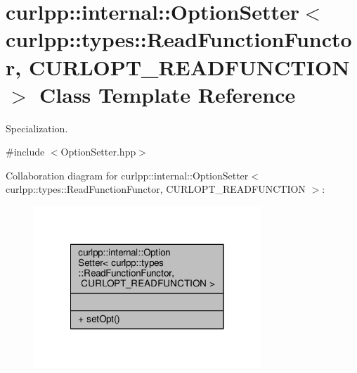 \hypertarget{classcurlpp_1_1internal_1_1OptionSetter_3_01curlpp_1_1types_1_1ReadFunctionFunctor_00_01CURLOPT__READFUNCTION_01_4}{\section{curlpp\-:\-:internal\-:\-:Option\-Setter$<$ curlpp\-:\-:types\-:\-:Read\-Function\-Functor, C\-U\-R\-L\-O\-P\-T\-\_\-\-R\-E\-A\-D\-F\-U\-N\-C\-T\-I\-O\-N $>$ Class Template Reference}
\label{classcurlpp_1_1internal_1_1OptionSetter_3_01curlpp_1_1types_1_1ReadFunctionFunctor_00_01CURLOPT__READFUNCTION_01_4}
}


Specialization.  




{\ttfamily \#include $<$Option\-Setter.\-hpp$>$}



Collaboration diagram for curlpp\-:\-:internal\-:\-:Option\-Setter$<$ curlpp\-:\-:types\-:\-:Read\-Function\-Functor, C\-U\-R\-L\-O\-P\-T\-\_\-\-R\-E\-A\-D\-F\-U\-N\-C\-T\-I\-O\-N $>$\-:\nopagebreak
\begin{figure}[H]
\begin{center}
\leavevmode
\includegraphics[width=242pt]{classcurlpp_1_1internal_1_1OptionSetter_3_01curlpp_1_1types_1_1ReadFunctionFunctor_00_01CURLOPT__READFUNCTION_01_4__coll__graph}
\end{center}
\end{figure}
